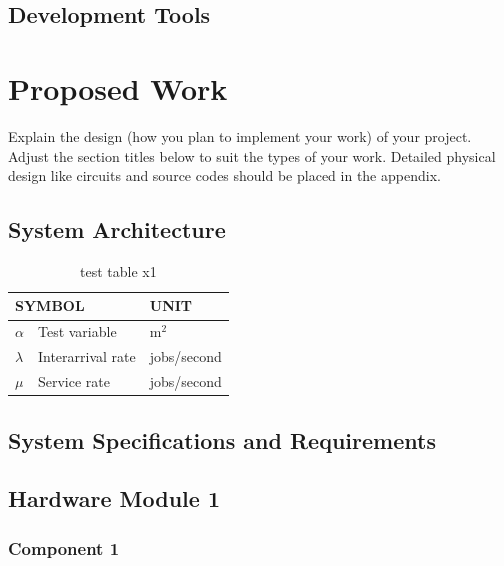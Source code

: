 \documentclass[12pt,oneside,openright,a4paper]{cpe-english-project}
\begin{document}
\section{Development Tools}

\chapter{Proposed Work}

Explain the design (how you plan to implement your work) of your project. Adjust the section titles below to suit the types of your work. Detailed physical design like circuits and source codes should be placed in the appendix.

\section{System Architecture}

\begin{table}[!h]
\centering
\caption{test table x1}\label{tbl:symbols}
\begin{tabular}{@{}p{}|p{}p{}}\hline
\multicolumn{2}{l}{\textbf{SYMBOL}}  & \textbf{UNIT} \\ \hline 
$\alpha$ & Test variable\hfill & m$^2$ \\
$\lambda$ & Interarrival rate\hfill &  jobs/second\\
$\mu$ & Service rate\hfill & jobs/second \\ \hline
\end{tabular}
\end{table}

\section{System Specifications and Requirements}

\section{Hardware Module 1}
\subsection{Component 1}
\end{document}
